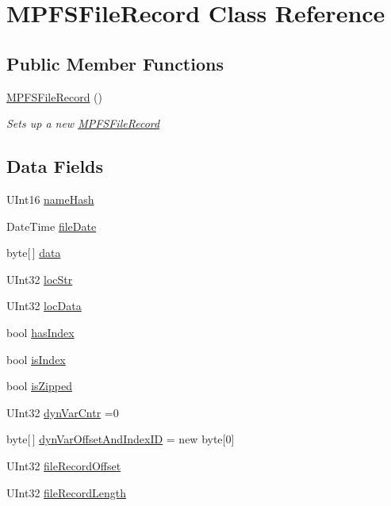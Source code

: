 \hypertarget{class_microchip_1_1_m_p_f_s_file_record}{}\section{M\+P\+F\+S\+File\+Record Class Reference}
\label{class_microchip_1_1_m_p_f_s_file_record}
\subsection*{Public Member Functions}
\begin{DoxyCompactItemize}
\item 
\hyperlink{class_microchip_1_1_m_p_f_s_file_record_adccb978b4976bf9d48cc73503a54ad96}{M\+P\+F\+S\+File\+Record} ()
\begin{DoxyCompactList}\small\item\em Sets up a new \hyperlink{class_microchip_1_1_m_p_f_s_file_record}{M\+P\+F\+S\+File\+Record} \end{DoxyCompactList}\end{DoxyCompactItemize}
\subsection*{Data Fields}
\begin{DoxyCompactItemize}
\item 
U\+Int16 \hyperlink{class_microchip_1_1_m_p_f_s_file_record_aeb0642208aa779de12a59f1cd4e7ee94}{name\+Hash}
\item 
Date\+Time \hyperlink{class_microchip_1_1_m_p_f_s_file_record_a58b9754e89903d977e262f1867f630cc}{file\+Date}
\item 
byte\mbox{[}$\,$\mbox{]} \hyperlink{class_microchip_1_1_m_p_f_s_file_record_a0ad80c378fb4b5fe4bc8a855302c4ae1}{data}
\item 
U\+Int32 \hyperlink{class_microchip_1_1_m_p_f_s_file_record_ae1a647b24a9ed0aa94a57d946e7a702d}{loc\+Str}
\item 
U\+Int32 \hyperlink{class_microchip_1_1_m_p_f_s_file_record_a972c2f0e818f5a6f0b46592b6d03fa9b}{loc\+Data}
\item 
bool \hyperlink{class_microchip_1_1_m_p_f_s_file_record_a2282c6adb44ef64074324add3b5ea330}{has\+Index}
\item 
bool \hyperlink{class_microchip_1_1_m_p_f_s_file_record_aa742ba46f92db2fdaff5d71153b4c446}{is\+Index}
\item 
bool \hyperlink{class_microchip_1_1_m_p_f_s_file_record_ae4508eac399ab2c844bb09b163e71f46}{is\+Zipped}
\item 
U\+Int32 \hyperlink{class_microchip_1_1_m_p_f_s_file_record_ad6a2e5dcfd91bd0260a8854183375acf}{dyn\+Var\+Cntr} =0
\item 
byte\mbox{[}$\,$\mbox{]} \hyperlink{class_microchip_1_1_m_p_f_s_file_record_ad3a069e40c353aa918d06e8ae9e6c9ff}{dyn\+Var\+Offset\+And\+Index\+I\+D} = new byte\mbox{[}0\mbox{]}
\item 
U\+Int32 \hyperlink{class_microchip_1_1_m_p_f_s_file_record_a7b5f5f117fd6cc4622bb58d4c2c6ab15}{file\+Record\+Offset}
\item 
U\+Int32 \hyperlink{class_microchip_1_1_m_p_f_s_file_record_ab900953d8ed2865284bc00803b27164c}{file\+Record\+Length}
\end{DoxyCompactItemize}
